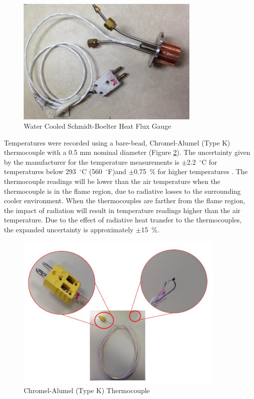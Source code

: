 \documentclass[12pt,oneside]{book}
\begin{document}
\begin{figure} [H]
	\centering
	\includegraphics[width = 3.5in]{0_Images/Instrumentation/Heat_Flux_Gauge.jpg}
	\caption{Water Cooled Schmidt-Boelter Heat Flux Gauge}
	\label{fig:HeatFluxGauge}
\end{figure}

Temperatures were recorded using a bare-bead, Chromel-Alumel (Type K) thermocouple with a 0.5 mm nominal diameter (Figure \ref{fig:Thermocouple}). The uncertainty given by the manufacturer for the temperature measurements is $\pm$2.2~$^\circ$C for temperatures below 293~$^\circ$C (560~$^\circ$F)and $\pm$0.75~\% for higher temperatures \cite{TemperatureHandbook}. The thermocouple readings will be lower than the air temperature when the thermocouple is in the flame region, due to radiative losses to the surrounding cooler environment. When the thermocouples are farther from the flame region, the impact of radiation will result in temperature readings higher than the air temperature. Due to the effect of radiative heat transfer to the thermocouples, the expanded uncertainty is approximately $\pm$15~\%.

\begin{figure} [H]
	\centering
	\includegraphics[width = 4in]{0_Images/Instrumentation/Thermocouple.jpg}
	\caption{Chromel-Alumel (Type K) Thermocouple}
	\label{fig:Thermocouple}
\end{figure}
\end{document}
